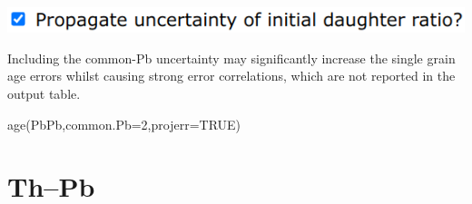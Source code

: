 \begin{refsection}
\begin{enumerate}
\noindent\begin{minipage}[t]{.5\linewidth}
\strut\vspace*{-\baselineskip}\newline
\includegraphics[width=\linewidth]{../figures/projerr.png}
\end{minipage}
\begin{minipage}[t]{.5\linewidth}
  Including the common-Pb uncertainty may significantly increase the
  single grain age errors whilst causing strong error correlations,
  which are not reported in the output table.
\end{minipage}

\begin{script}
age(PbPb,common.Pb=2,projerr=TRUE)
\end{script}

\end{enumerate}

\section{Th--Pb}\label{sec:ThPb-R}


\end{refsection}
